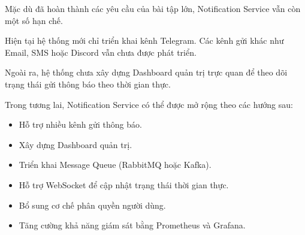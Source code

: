 Mặc dù đã hoàn thành các yêu cầu của bài tập lớn, Notification Service vẫn còn một số hạn chế.

Hiện tại hệ thống mới chỉ triển khai kênh Telegram. Các kênh gửi khác như Email, SMS hoặc Discord vẫn chưa được phát triển.

Ngoài ra, hệ thống chưa xây dựng Dashboard quản trị trực quan để theo dõi trạng thái gửi thông báo theo thời gian thực.

Trong tương lai, Notification Service có thể được mở rộng theo các hướng sau:

\begin{itemize}
\item Hỗ trợ nhiều kênh gửi thông báo.
\item Xây dựng Dashboard quản trị.
\item Triển khai Message Queue (RabbitMQ hoặc Kafka).
\item Hỗ trợ WebSocket để cập nhật trạng thái thời gian thực.
\item Bổ sung cơ chế phân quyền người dùng.
\item Tăng cường khả năng giám sát bằng Prometheus và Grafana.
\end{itemize}

